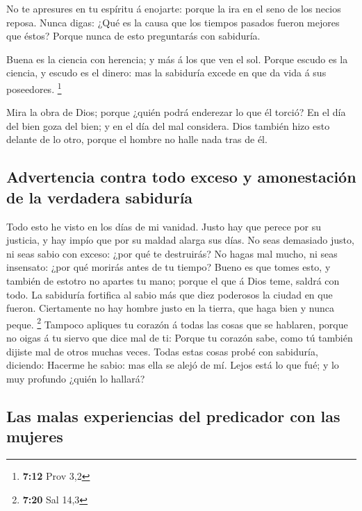  No te apresures en tu espíritu á enojarte: porque la ira en
el seno de los necios reposa.  Nunca digas: ¿Qué es la
causa que los tiempos pasados fueron mejores que éstos? Porque nunca de
esto preguntarás con sabiduría.

 Buena es la ciencia con herencia; y más á los que ven el
sol.  Porque escudo es la ciencia, y escudo es el dinero:
mas la sabiduría excede en que da vida á sus poseedores. \footnote{\textbf{7:12}
  Prov 3,2}

 Mira la obra de Dios; porque ¿quién podrá enderezar lo que
él torció?  En el día del bien goza del bien; y en el día
del mal considera. Dios también hizo esto delante de lo otro, porque el
hombre no halle nada tras de él.

\hypertarget{advertencia-contra-todo-exceso-y-amonestaciuxf3n-de-la-verdadera-sabiduruxeda}{%
\subsection{Advertencia contra todo exceso y amonestación de la
verdadera
sabiduría}\label{advertencia-contra-todo-exceso-y-amonestaciuxf3n-de-la-verdadera-sabiduruxeda}}

 Todo esto he visto en los días de mi vanidad. Justo hay
que perece por su justicia, y hay impío que por su maldad alarga sus
días.  No seas demasiado justo, ni seas sabio con exceso:
¿por qué te destruirás?  No hagas mal mucho, ni seas
insensato: ¿por qué morirás antes de tu tiempo?  Bueno es
que tomes esto, y también de estotro no apartes tu mano; porque el que á
Dios teme, saldrá con todo.  La sabiduría fortifica al
sabio más que diez poderosos la ciudad en que fueron. 
Ciertamente no hay hombre justo en la tierra, que haga bien y nunca
peque. \footnote{\textbf{7:20} Sal 14,3}  Tampoco apliques
tu corazón á todas las cosas que se hablaren, porque no oigas á tu
siervo que dice mal de ti:  Porque tu corazón sabe, como tú
también dijiste mal de otros muchas veces.  Todas estas
cosas probé con sabiduría, diciendo: Hacerme he sabio: mas ella se alejó
de mí.  Lejos está lo que fué; y lo muy profundo ¿quién lo
hallará?

\hypertarget{las-malas-experiencias-del-predicador-con-las-mujeres}{%
\subsection{Las malas experiencias del predicador con las
mujeres}\label{las-malas-experiencias-del-predicador-con-las-mujeres}}

